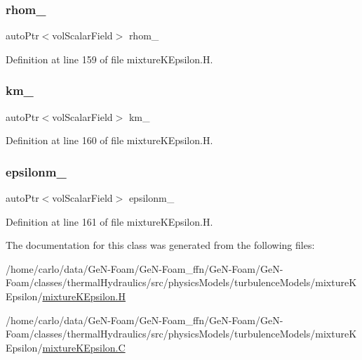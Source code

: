 \subsubsection{\texorpdfstring{rhom\+\_\+}{rhom\_}}
{\footnotesize\ttfamily auto\+Ptr$<$vol\+Scalar\+Field$>$ rhom\+\_\+\hspace{0.3cm}{\ttfamily [protected]}}



Definition at line 159 of file mixture\+K\+Epsilon.\+H.

\mbox{\label{classFoam_1_1RASModels_1_1mixtureKEpsilon_a844a88970f0a98d219eac0603ecc21b6}} 
\subsubsection{\texorpdfstring{km\+\_\+}{km\_}}
{\footnotesize\ttfamily auto\+Ptr$<$vol\+Scalar\+Field$>$ km\+\_\+\hspace{0.3cm}{\ttfamily [protected]}}



Definition at line 160 of file mixture\+K\+Epsilon.\+H.

\mbox{\label{classFoam_1_1RASModels_1_1mixtureKEpsilon_ad5e528caf764b09f47f74b00a2a9a808}} 
\subsubsection{\texorpdfstring{epsilonm\+\_\+}{epsilonm\_}}
{\footnotesize\ttfamily auto\+Ptr$<$vol\+Scalar\+Field$>$ epsilonm\+\_\+\hspace{0.3cm}{\ttfamily [protected]}}



Definition at line 161 of file mixture\+K\+Epsilon.\+H.



The documentation for this class was generated from the following files\+:\begin{DoxyCompactItemize}
\item 
/home/carlo/data/\+Ge\+N-\/\+Foam/\+Ge\+N-\/\+Foam\+\_\+ffn/\+Ge\+N-\/\+Foam/\+Ge\+N-\/\+Foam/classes/thermal\+Hydraulics/src/physics\+Models/turbulence\+Models/mixture\+K\+Epsilon/\hyperlink{mixtureKEpsilon_8H}{mixture\+K\+Epsilon.\+H}\item 
/home/carlo/data/\+Ge\+N-\/\+Foam/\+Ge\+N-\/\+Foam\+\_\+ffn/\+Ge\+N-\/\+Foam/\+Ge\+N-\/\+Foam/classes/thermal\+Hydraulics/src/physics\+Models/turbulence\+Models/mixture\+K\+Epsilon/\hyperlink{mixtureKEpsilon_8C}{mixture\+K\+Epsilon.\+C}\end{DoxyCompactItemize}
